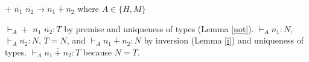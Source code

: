 \begin{case}
$+$ $\overline{n_{1}}$ $\overline{n_{2}}\rightarrow\overline{n_{1}+n_{2}}$ where $A\in\lbrace H,M\rbrace$

$\vdash_{A}+$ $\overline{n_{1}}$ $\overline{n_{2}}:T$ by premise and uniqueness of types (Lemma \ref{uot}).  $\vdash_{A}\overline{n_{1}}:N$, $\vdash_{A}\overline{n_{2}}:N$, $T=N$, and $\vdash_{A}\overline{n_{1}+n_{2}}:N$ by inversion (Lemma \ref{i}) and uniqueness of types.  $\vdash_{A}\overline{n_{1}+n_{2}}:T$ because $N=T$.
\end{case}